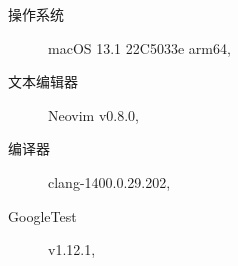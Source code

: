 \begin{description}
	\item[操作系统] macOS 13.1 22C5033e arm64,
	\item[文本编辑器] Neovim v0.8.0,
	\item[编译器] clang-1400.0.29.202,
	\item [GoogleTest] v1.12.1,
\end{description}
